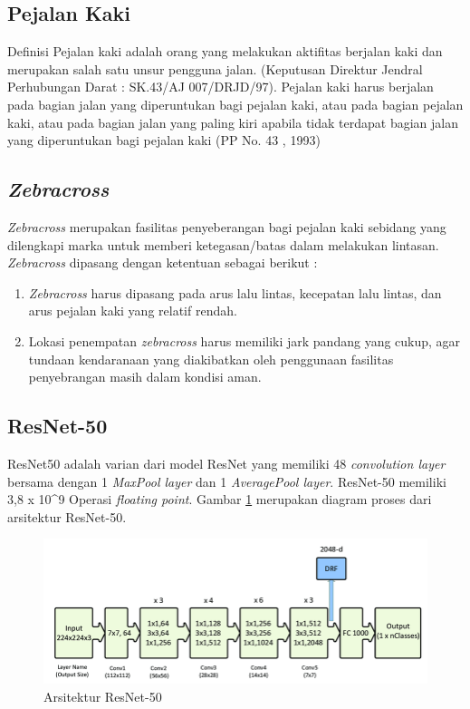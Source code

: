\subsection{Pejalan Kaki}
\label{subsec:pedestrian}

Definisi Pejalan kaki adalah orang yang melakukan aktifitas berjalan kaki dan merupakan salah satu unsur pengguna jalan. (Keputusan Direktur Jendral Perhubungan Darat : SK.43/AJ 007/DRJD/97). Pejalan kaki harus berjalan pada bagian jalan yang diperuntukan bagi pejalan kaki, atau pada bagian pejalan kaki, atau pada bagian jalan yang paling kiri apabila tidak terdapat bagian jalan yang diperuntukan bagi pejalan kaki (PP No. 43 , 1993)


\subsection{\textit{Zebracross}}
\label{subsec:zebracross}

\textit{Zebracross} merupakan  fasilitas penyeberangan bagi pejalan kaki sebidang yang dilengkapi marka untuk memberi ketegasan/batas dalam melakukan lintasan. \textit{Zebracross} dipasang dengan ketentuan sebagai berikut :
\begin{enumerate}
	\item \textit{Zebracross} harus dipasang pada arus lalu lintas, kecepatan lalu lintas, dan arus pejalan kaki yang relatif rendah.
	\item Lokasi penempatan \textit{zebracross} harus memiliki jark pandang yang cukup, agar tundaan kendaranaan yang diakibatkan oleh penggunaan fasilitas penyebrangan masih dalam kondisi aman. 
\end{enumerate}

\subsection{ResNet-50}
\label{subsec:resnet50-definition}

ResNet50 adalah varian dari model ResNet yang memiliki 48 \textit{convolution layer} bersama dengan 1 \textit{MaxPool layer} dan 1 \textit{AveragePool layer}. ResNet-50 memiliki 3,8 x 10\^{}9 Operasi \textit{floating point}. Gambar \ref{fig:resnet50-arch} merupakan diagram proses dari arsitektur ResNet-50.
\begin{figure}[H]
	\centering
	\includegraphics[scale=0.25]{gambar/resnet50-arch.png}
	\caption{Arsitektur ResNet-50 \citep{resnet50-arch}}
	\label{fig:resnet50-arch}
\end{figure}

